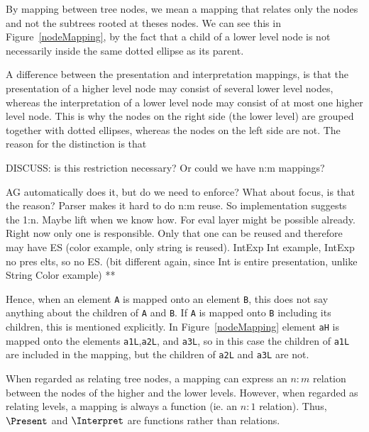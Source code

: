 By mapping between tree nodes, we mean a mapping that relates only the nodes and not the subtrees rooted at theses nodes. We can see this in Figure~\ref{nodeMapping}, by the fact that a child of a lower level node is not necessarily inside the same dotted ellipse as its parent. 


A difference between the presentation and interpretation mappings, is that the presentation of a higher level node may consist of several lower level nodes, whereas the interpretation of a lower level node may consist of at most one higher level node. This is why the nodes on the right side (the lower level) are grouped together with dotted ellipses, whereas the nodes on the left side are not. The reason for the distinction is that 
\toHere     %

DISCUSS: is this restriction necessary? Or could we have n:m mappings?

AG automatically does it, but do we need to enforce? What about focus, is that the reason?
Parser makes it hard to do n:m reuse. So implementation suggests the 1:n. Maybe lift when we know how. For eval layer might be possible already. Right now only one is responsible.  Only that one can be reused and therefore may have ES (color example, only string is reused). IntExp Int example, IntExp no pres elts, so no ES. (bit different again, since Int is entire presentation, unlike String Color example) 
**
\fromHere  %


\bc
Hence, when an element \verb|A| is mapped onto an element \verb|B|, this does not say anything about the children of \verb|A| and \verb|B|. If \verb|A| is mapped onto \verb|B| including its children, this is mentioned explicitly. In Figure~\ref{nodeMapping} element \verb|aH| is mapped onto the elements \verb|a1L|,\verb|a2L|, and \verb|a3L|, so in this case the children of \verb|a1L| are included in the mapping, but the children of \verb|a2L| and \verb|a3L| are not. 
\ec

\bc
When regarded as relating tree nodes, a mapping can express an $n:m$ relation between the nodes of the higher and the lower levels. However, when regarded as relating levels, a mapping is always a function (ie. an $n:1$ relation). Thus, $\Present$ and $\Interpret$ are functions rather than relations.
\ec

